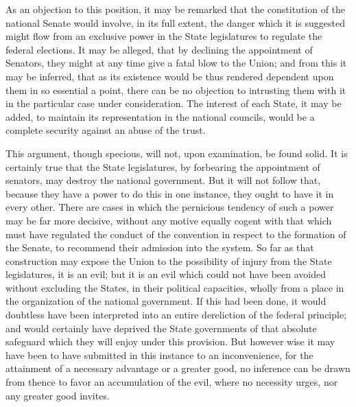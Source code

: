 As an objection to this position, it may be remarked that the constitution of the national Senate would involve, in its full extent, the danger which it is suggested might flow from an exclusive power in the State legislatures to regulate the federal elections. It may be alleged, that by declining the appointment of Senators, they might at any time give a fatal blow to the Union; and from this it may be inferred, that as its existence would be thus rendered dependent upon them in so essential a point, there can be no objection to intrusting them with it in the particular case under consideration. The interest of each State, it may be added, to maintain its representation in the national councils, would be a complete security against an abuse of the trust.

This argument, though specious, will not, upon examination, be found solid. It is certainly true that the State legislatures, by forbearing the appointment of senators, may destroy the national government. But it will not follow that, because they have a power to do this in one instance, they ought to have it in every other. There are cases in which the pernicious tendency of such a power may be far more decisive, without any motive equally cogent with that which must have regulated the conduct of the convention in respect to the formation of the Senate, to recommend their admission into the system. So far as that construction may expose the Union to the possibility of injury from the State legislatures, it is an evil; but it is an evil which could not have been avoided without excluding the States, in their political capacities, wholly from a place in the organization of the national government. If this had been done, it would doubtless have been interpreted into an entire dereliction of the federal principle; and would certainly have deprived the State governments of that absolute safeguard which they will enjoy under this provision. But however wise it may have been to have submitted in this instance to an inconvenience, for the attainment of a necessary advantage or a greater good, no inference can be drawn from thence to favor an accumulation of the evil, where no necessity urges, nor any greater good invites.

